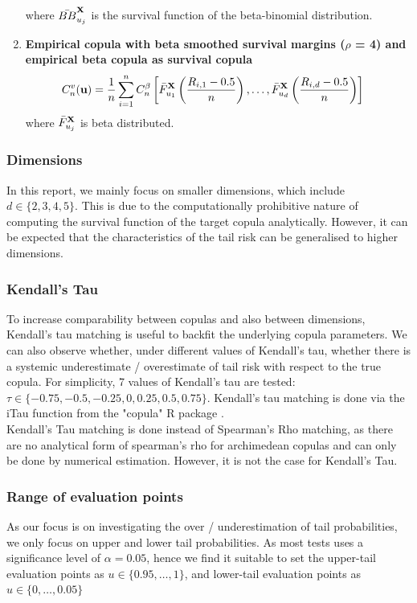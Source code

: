 \documentclass[12pt]{report}
\newcommand{\1}{\mathbf{1}}
\begin{document}
\begin{flushleft}
\begin{enumerate}
\begin{align*}
\end{align*}
where $\Bar{BB}_{u_{j}}^{\textbf{X}}$ is the survival function of the beta-binomial distribution.
\item \textbf{Empirical copula with beta smoothed survival margins ($\rho$ = 4) and empirical beta copula as survival copula}
\begin{align*}
C_{n}^{v}(\textbf{u}) &= \frac{1}{n} \sum\limits_{i = 1}^{n} C_{n}^{\beta} \left[\Bar{F}_{u_{1}}^{\textbf{X}}\left(\frac{R_{i,1} - 0.5}{n}\right), \dots, \Bar{F}_{u_{d}}^{\textbf{X}}\left(\frac{R_{i,d} - 0.5}{n}\right) \right]
\end{align*}
where $\Bar{F}_{u_{j}}^{\textbf{X}}$ is beta distributed.
\end{enumerate}

\subsubsection{Dimensions}

In this report, we mainly focus on smaller dimensions, which include $d \in \{ 2, 3, 4, 5 \}$. This is due to the computationally prohibitive nature of computing the survival function of the target copula analytically. However, it can be expected that the characteristics of the tail risk can be generalised to higher dimensions.

\subsubsection{Kendall's Tau}
To increase comparability between copulas and also between dimensions, Kendall's tau matching is useful to backfit the underlying copula parameters. We can also observe whether, under different values of Kendall's tau, whether there is a systemic underestimate / overestimate of tail risk with respect to the true copula. For simplicity, 7 values of Kendall's tau are tested: $\tau \in \{ -0.75, -0.5, -0.25, 0, 0.25, 0.5, 0.75 \}$. Kendall's tau matching is done via the iTau function from the "copula" R package \parencite{copulaRPackage2023}. \\
\vspace{0.5cm}
Kendall's Tau matching is done instead of Spearman's Rho matching, as there are no analytical form of spearman's rho for archimedean copulas and can only be done by numerical estimation. However, it is not the case for Kendall's Tau.

\subsubsection{Range of evaluation points}
As our focus is on investigating the over / underestimation of tail probabilities, we only focus on upper and lower tail probabilities. As most tests uses a significance level of $\alpha = 0.05$, hence we find it suitable to set the upper-tail evaluation points as $u \in \{ 0.95, \dots, 1 \}$, and lower-tail evaluation points as $u \in \{ 0, \dots, 0.05 \}$


\end{flushleft}
\end{document}
